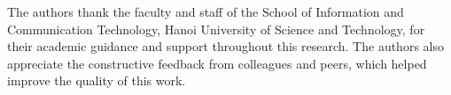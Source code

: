 The authors thank the faculty and staff of the School of Information and Communication Technology, Hanoi University of Science and Technology, for their academic guidance and support throughout this research. The authors also appreciate the constructive feedback from colleagues and peers, which helped improve the quality of this work.

